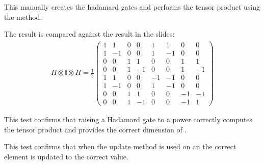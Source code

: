 \documentclass[letterpaper,10pt,english]{sphinxmanual}
\begin{document}
\begin{fulllineitems}
\begin{fulllineitems}
\sphinxAtStartPar
This manually creates the hadamard gates and performs the tensor
product using the  method.

\sphinxAtStartPar
The result is compared against the result in the slides:
\begin{equation*}
\begin{split}H \otimes \mathbb{I} \otimes H = \frac{1}{2}
    \begin{pmatrix}
        1 & 1 & 0 & 0 & 1 & 1 & 0 & 0 \\
        1 & -1 & 0 & 0 & 1 & -1 & 0 & 0 \\
        0 & 0 & 1 & 1 & 0 & 0 & 1 & 1 \\
        0 & 0 & 1 & -1 & 0 & 0 & 1 & -1 \\
        1 & 1 & 0 & 0 & -1 & -1 & 0 & 0 \\
        1 & -1 & 0 & 0 & 1 & -1 & 0 & 0 \\
        0 & 0 & 1 & 1 & 0 & 0 & -1 & -1 \\
        0 & 0 & 1 & -1 & 0 & 0 & -1 & 1
    \end{pmatrix}\end{split}
\end{equation*}
\end{fulllineitems}


\begin{fulllineitems}
\label{\detokenize{index:tests.test_tensor.TestOperator.test_product_of_H_gates}}
\pysigstartsignatures
{}
\pysigstopsignatures
\sphinxAtStartPar
This test confirms that raising a Hadamard gate to a power
correctly computes the tensor product and provides the
correct dimension of .

\end{fulllineitems}


\begin{fulllineitems}
\label{\detokenize{index:tests.test_tensor.TestOperator.test_update}}
\pysigstartsignatures
{}
\pysigstopsignatures
\sphinxAtStartPar
This test confirms that when the update method is used on an 
the correct element is updated to the correct value.

\end{fulllineitems}


\end{fulllineitems}
\end{document}
